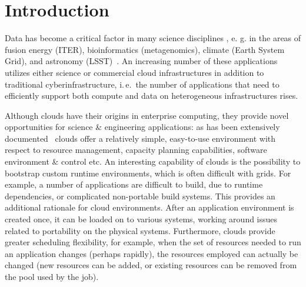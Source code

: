 \documentclass[times]{cpeauth}
\begin{document}
\maketitle


\vspace{-6pt}

\section{Introduction}
\vspace{-2pt}

Data has become a critical factor in many science disciplines
\cite{fourthparadigm}, e. g. in the areas of fusion energy (ITER),
bioinformatics (metagenomics), climate (Earth System Grid), and
astronomy (LSST)~\cite{Jha:2011fk}. An increasing number of these
applications utilizes either science or commercial cloud
infrastructures in addition to traditional cyberinfrastructure,
i.\,e.\ the number of applications that need to efficiently support
both compute and data on heterogeneous infrastructures rises.


Although clouds have their origins in enterprise computing, they
provide novel opportunities for science \& engineering applications:
as has been extensively documented~\cite{Jha:2010kx} clouds offer a
relatively simple, easy-to-use environment with respect to resource
management, capacity planning capabilities, software environment \&
control etc.  An interesting capability of clouds is the possibility
to bootstrap custom runtime environments, which is often difficult
with grids. For example, a number of applications are difficult to
build, due to runtime dependencies, or complicated non-portable build
systems. This provides an additional rationale for cloud
environments. After an application environment is created once, it can
be loaded on to various systems, working around issues related to
portability on the physical systems. Furthermore, clouds provide
greater scheduling flexibility, for example, when the set of resources
needed to run an application changes (perhaps rapidly), the resources
employed can actually be changed (new resources can be added, or
existing resources can be removed from the pool used by the job).
\end{document}
